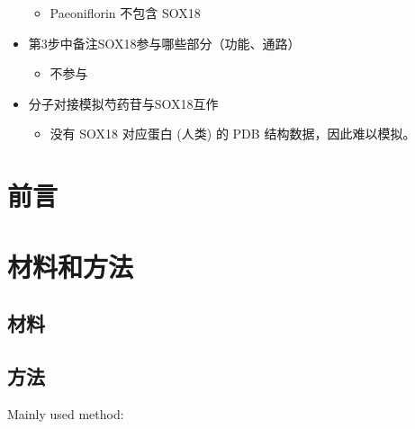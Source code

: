 \documentclass[
]{article}
\providecommand{\tightlist}{%
  \setlength{\itemsep}{0pt}\setlength{\parskip}{0pt}}
\begin{document}
\begin{itemize}
  \begin{itemize}
  \tightlist
  \item
    Paeoniflorin 不包含 SOX18
  \end{itemize}
\item
  第3步中备注SOX18参与哪些部分（功能、通路）

  \begin{itemize}
  \tightlist
  \item
    不参与
  \end{itemize}
\item
  分子对接模拟芍药苷与SOX18互作

  \begin{itemize}
  \tightlist
  \item
    没有 SOX18 对应蛋白 (人类) 的 PDB 结构数据，因此难以模拟。
  \end{itemize}
\end{itemize}

\hypertarget{introduction}{%
\section{前言}\label{introduction}}

\hypertarget{methods}{%
\section{材料和方法}\label{methods}}

\hypertarget{ux6750ux6599}{%
\subsection{材料}\label{ux6750ux6599}}

\hypertarget{ux65b9ux6cd5}{%
\subsection{方法}\label{ux65b9ux6cd5}}

Mainly used method:
\end{document}

